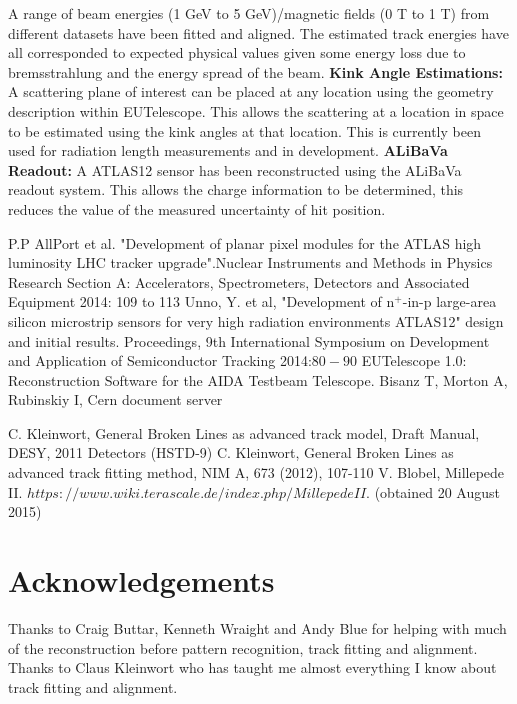 \documentclass[a0,portrait]{a0poster}
\begin{document}
\begin{multicols}{2}
A range of beam energies (1 GeV to 5 GeV)/magnetic fields (0 T to 1 T) from different datasets have been fitted and aligned. The estimated track energies have all corresponded to expected physical values given some energy loss due to bremsstrahlung and the energy spread of the beam.
\newline
\newline
\textbf{Kink Angle Estimations:} A scattering plane of interest can be placed at any location using the geometry description within EUTelescope. This allows the scattering at a location in space to be estimated using the kink angles at that location. This is currently been used for radiation length measurements and in development. 
\newline
\newline
\textbf{ALiBaVa Readout:} A ATLAS12 sensor has been reconstructed using the ALiBaVa readout system. This allows the charge information to be determined, this reduces the value of the measured uncertainty of hit position. 

\begin{thebibliography}{9}
	 P.P AllPort et al. "Development of planar pixel modules for the ATLAS high luminosity LHC tracker upgrade".Nuclear Instruments and Methods in Physics Research Section A: Accelerators, Spectrometers, Detectors and Associated Equipment 2014: 109 to 113
	 Unno, Y. et al, "Development of n$^+$-in-p large-area silicon microstrip sensors for very high radiation environments  ATLAS12" design and initial results. Proceedings, 9th International Symposium on Development and Application of Semiconductor Tracking 2014:$80-90$ 
 EUTelescope 1.0: Reconstruction Software for the AIDA Testbeam Telescope. Bisanz T, Morton A, Rubinskiy I, Cern document server

	  C. Kleinwort, General Broken Lines as advanced track model, Draft Manual, DESY, 2011
                        Detectors (HSTD-9)
	  C. Kleinwort, General Broken Lines as advanced track fitting method, NIM A, 673 (2012), 107-110
	 V. Blobel, Millepede II. $https://www.wiki.terascale.de/index.php/MillepedeII$. (obtained 20 August 2015)
\end{thebibliography}

\section*{Acknowledgements}
Thanks to Craig Buttar, Kenneth Wraight and Andy Blue for helping with much of the reconstruction before pattern recognition, track fitting and alignment. Thanks to Claus Kleinwort who has taught me almost everything I know about track fitting and alignment. 




\end{multicols}
\end{document}
